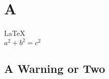 \documentclass{article}
\begin{document}
               
 
\section{A}          
\LaTeX \,\\ 
 $a^2+b^2=c^2$

\subsection{A Warning or Two}  

\end{document}

